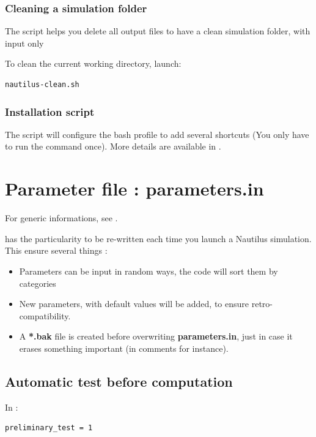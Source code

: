 \documentclass[english,a4paper,twoside]{article}
\begin{document}
\subsubsection{Cleaning a simulation folder}
The script  helps you delete all output files to have a clean simulation folder, with input only

To clean the current working directory, launch:
\begin{verbatim}
nautilus-clean.sh
\end{verbatim}

\subsubsection{Installation script}
The script  will configure the bash profile to add several shortcuts (You only have to run the command once). More details are available in .

\section{Parameter file : parameters.in}\label{sec:parameters_in}
For generic informations, see .

 has the particularity to be re-written each time you launch a Nautilus simulation. This ensure several things :
\begin{itemize}
\item Parameters can be input in random ways, the code will sort them by categories
\item New parameters, with default values will be added, to ensure retro-compatibility.
\item A \textbf{*.bak} file is created before overwriting \textbf{parameters.in}, just in case it erases something important (in comments for instance).
\end{itemize}

\subsection{Automatic test before computation}
In : 
\begin{verbatim}
preliminary_test = 1
\end{verbatim}
\end{document}
